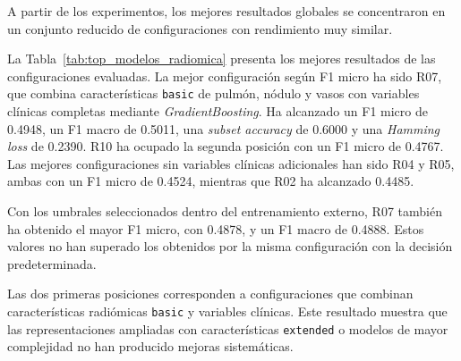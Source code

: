 A partir de los experimentos, los mejores resultados globales se concentraron en un conjunto reducido de configuraciones con rendimiento muy similar.


La Tabla~\ref{tab:top_modelos_radiomica} presenta los mejores resultados de las configuraciones evaluadas. La mejor configuración según F1 micro ha sido R07, que combina características \texttt{basic} de pulmón, nódulo y vasos con variables clínicas completas mediante \textit{GradientBoosting}. Ha alcanzado un F1 micro de 0.4948, un F1 macro de 0.5011, una \textit{subset accuracy} de 0.6000 y una \textit{Hamming loss} de 0.2390. R10 ha ocupado la segunda posición con un F1 micro de 0.4767. Las mejores configuraciones sin variables clínicas adicionales han sido R04 y R05, ambas con un F1 micro de 0.4524, mientras que R02 ha alcanzado 0.4485.

Con los umbrales seleccionados dentro del entrenamiento externo, R07 también ha obtenido el mayor F1 micro, con 0.4878, y un F1 macro de 0.4888. Estos valores no han superado los obtenidos por la misma configuración con la decisión predeterminada.

Las dos primeras posiciones corresponden a configuraciones que combinan características radiómicas \texttt{basic} y variables clínicas. Este resultado muestra que las representaciones ampliadas con características \texttt{extended} o modelos de mayor complejidad no han producido mejoras sistemáticas.

